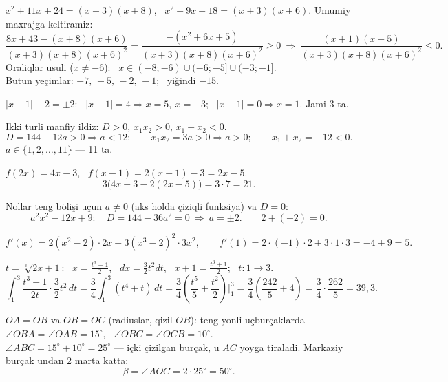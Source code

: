 $x^2+11x+24=(x+3)(x+8)$, \ $x^2+9x+18=(x+3)(x+6)$. Umumiy maxrajga keltiramiz:
\[\frac{8x+43-(x+8)(x+6)}{(x+3)(x+8)(x+6)^2}=\frac{-(x^2+6x+5)}{(x+3)(x+8)(x+6)^2}\ge0\ \Rightarrow\ \frac{(x+1)(x+5)}{(x+3)(x+8)(x+6)^2}\le0.\]
Oraliqlar usuli ($x\ne-6$): \ $x\in(-8;-6)\cup(-6;-5]\cup(-3;-1]$.\\
Butun yeçimlar: $-7,\,-5,\,-2,\,-1$; \ yiğindi $-15$.

$|x-1|-2=\pm2$: \ $|x-1|=4\Rightarrow x=5,\ x=-3$; \ $|x-1|=0\Rightarrow x=1$. Jami 3 ta.

Ikki turli manfiy ildiz: $D>0$, $x_1x_2>0$, $x_1+x_2<0$.
\[D=144-12a>0\Rightarrow a<12;\qquad x_1x_2=3a>0\Rightarrow a>0;\qquad x_1+x_2=-12<0.\]
$a\in\{1,2,\dots,11\}$ — 11 ta.

$f(2x)=4x-3$, \ $f(x-1)=2(x-1)-3=2x-5$.
\[3\bigl(4x-3-2(2x-5)\bigr)=3\cdot7=21.\]

Nollar teng bölişi uçun $a\ne0$ (aks holda çiziqli funksiya) va $D=0$:
\[a^2x^2-12x+9:\quad D=144-36a^2=0\ \Rightarrow\ a=\pm2.\qquad 2+(-2)=0.\]

\[f'(x)=2(x^2-2)\cdot2x+3(x^3-2)^2\cdot3x^2,\qquad f'(1)=2\cdot(-1)\cdot2+3\cdot1\cdot3=-4+9=5.\]

$t=\sqrt[3]{2x+1}$: \ $x=\frac{t^3-1}2$, \ $dx=\frac32t^2dt$, \ $x+1=\frac{t^3+1}2$; \ $t:1\to3$.
\[\int_1^3\frac{t^3+1}{2t}\cdot\frac32t^2\,dt=\frac34\int_1^3(t^4+t)\,dt=\frac34\left(\frac{t^5}5+\frac{t^2}2\right)\Big|_1^3=\frac34\left(\frac{242}5+4\right)=\frac34\cdot\frac{262}5=39{,}3.\]

$OA=OB$ va $OB=OC$ (radiuslar, \textcolor{aux}{qizil} $OB$): teng yonli uçburçaklarda $\angle OBA=\angle OAB=15^\circ$, \ $\angle OBC=\angle OCB=10^\circ$.\\
$\angle ABC=15^\circ+10^\circ=25^\circ$ — içki çizilgan burçak, u $AC$ yoyga tiraladi. Markaziy burçak undan 2 marta katta:
\[\beta=\angle AOC=2\cdot25^\circ=50^\circ.\]

